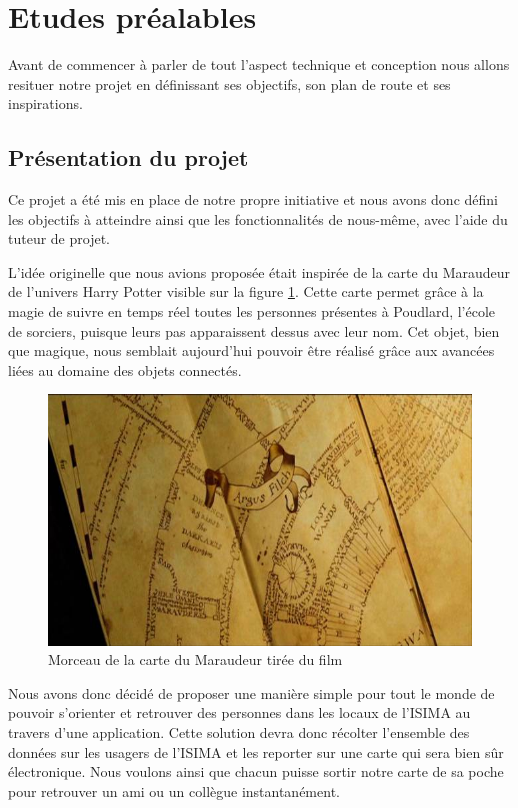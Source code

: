 \section{Etudes préalables}

Avant de commencer à parler de tout l’aspect technique et conception nous allons resituer notre projet en définissant ses objectifs, son plan de route et ses inspirations.

\subsection{Présentation du projet}

Ce projet a été mis en place de notre propre initiative et nous avons donc défini les objectifs à atteindre ainsi que les fonctionnalités de nous-même, avec l'aide du tuteur de projet.

L’idée originelle que nous avions proposée était inspirée de la carte du Maraudeur de l’univers Harry Potter visible sur la figure \ref{marauder}. Cette carte permet grâce à la magie de suivre en temps réel toutes les personnes présentes à Poudlard, l’école de sorciers, puisque leurs pas apparaissent dessus avec leur nom. Cet objet, bien que magique, nous semblait aujourd’hui pouvoir être réalisé grâce aux avancées liées au domaine des objets connectés. 

\begin{figure}[H]
    \centering
    \includegraphics[width=\textwidth]{./img/marauder.jpg}
    \caption{Morceau de la carte du Maraudeur tirée du film}
    \label{marauder}
\end{figure}

Nous avons donc décidé de proposer une manière simple pour tout le monde de pouvoir s'orienter et retrouver des personnes dans les locaux de l'ISIMA au travers d’une application. Cette solution devra donc récolter l’ensemble des données sur les usagers de l’ISIMA et les reporter sur une carte qui sera bien sûr électronique. Nous voulons ainsi que chacun puisse sortir notre carte de sa poche pour retrouver un ami ou un collègue instantanément.

